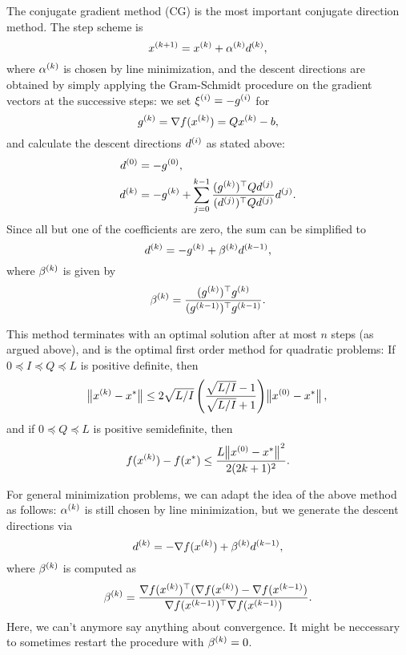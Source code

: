 \documentclass{article}
\begin{document}

The conjugate gradient method (CG) is the most important conjugate direction method.  The step
scheme is
\begin{equation*}
  \kth[k+1]{x} = \kth{x} + \kth{\alpha}\kth{d},
\end{equation*}
where \(\kth{\alpha}\) is chosen by line minimization, and the descent directions are obtained by
simply applying the Gram-Schmidt procedure on the gradient vectors at the successive steps: we set
\(\kth[i]{\xi} = -\kth[i]{g}\) for
\begin{equation*}
  \kth{g} = \nabla f(\kth{x}) = Q \kth{x} - b,
\end{equation*}
and calculate the descent directions \(\kth[i]{d}\) as stated above:
\begin{align*}
  \kth[0]{d} &= -\kth[0]{g}, \\
  \kth[k]{d} &= -\kth[k]{g} + \sum_{j=0}^{k-1}
               \frac{\T{(\kth[k]{g})} Q \kth[j]{d}}{\T{(\kth[j]{d})} Q \kth[j]{d}} \kth[j]{d}.
\end{align*}
Since all but one of the coefficients are zero, the sum can be simplified to
\begin{equation*}
  \kth{d} = -\kth{g} + \kth{\beta}\kth[k-1]{d},
\end{equation*}
where \(\kth{\beta}\) is given by
\begin{equation*}
  \kth{\beta} = \frac{\T{(\kth{g})}\kth{g}}{\T{(\kth[k-1]{g})}\kth[k-1]{g}}.
\end{equation*}

This method terminates with an optimal solution after at most \(n\) steps (as argued above), and is
the optimal first order method for quadratic problems: If \(0 \preceq I \preceq Q \preceq L\) is positive
definite, then
\begin{equation*}
  \enVert[1]{\kth{x} - x^*} \leq 2\sqrt{L/I} \left( \frac{\sqrt{L/I}-1}{\sqrt{L/I}+1} \right)
  \enVert[1]{\kth[0]{x} - x^*},
\end{equation*}
and if \(0 \preceq Q \preceq L\) is positive semidefinite, then
\begin{equation*}
  f(\kth{x}) - f(x^*) \leq \frac{L \enVert[1]{\kth[0]{x} - x^*}^2}{2 (2k + 1)^2}.
\end{equation*}



For general minimization problems, we can adapt the idea of the above method as follows:
\(\kth{\alpha}\) is still chosen by line minimization, but we generate the descent directions via
\begin{equation*}
  \kth{d} = -\nabla f(\kth{x}) + \kth{\beta}\kth[k-1]{d},
\end{equation*}
where \(\kth{\beta}\) is computed as
\begin{equation*}
  \kth{\beta} = \frac{\T{\nabla f(\kth{x})}(\nabla f(\kth{x}) - \nabla f(\kth[k-1]{x})}{
    \T{\nabla f(\kth[k-1]{x})} \nabla f(\kth[k-1]{x})}.
\end{equation*}
Here, we can't anymore say anything about convergence.  It might be neccessary to sometimes restart
the procedure with \(\kth{\beta} = 0\).
\end{document}
